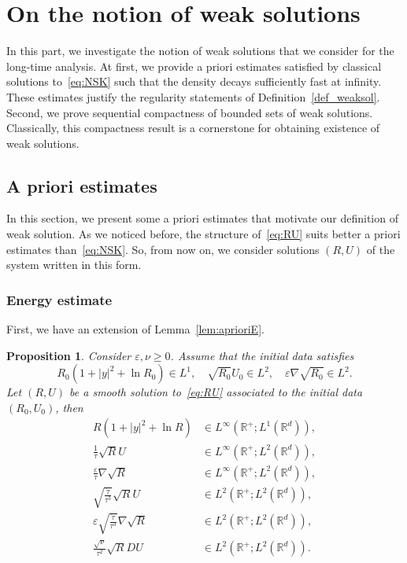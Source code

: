 \documentclass[11pt]{article}
\newtheorem{prop}[theo]{Proposition}
\theoremstyle{definition}
\numberwithin{equation}{section}
\numberwithin{figure}{section}
\numberwithin{table}{section}
\newcommand*\R{\mathbb{R}}
\newcommand*\<{\left\langle}
\renewcommand*\>{\right\rangle}
\renewcommand*\ge{\geqslant}
\newcommand*\eps{\varepsilon}
\begin{document}
\section{On the notion of weak solutions}\label{sec:compactness}

In this part, we investigate the notion of weak solutions that we consider for the long-time analysis. At first, we provide a priori estimates satisfied by classical solutions to~\eqref{eq:NSK} such that the density decays sufficiently fast at infinity. These estimates justify the regularity statements of Definition~\ref{def_weaksol}. Second, we prove sequential compactness of bounded sets of weak solutions. Classically, this compactness result is a cornerstone for obtaining existence of weak solutions.

\subsection{A priori estimates}\label{sec:apriori}

In this section, we present some a priori estimates that motivate our definition of weak solution. As we noticed before, the structure of~\eqref{eq:RU} suits better a priori estimates than~\eqref{eq:NSK}. So, from now on, we consider solutions $(R,U)$ of the system written in this form.

\subsubsection{Energy estimate}

First, we have an extension of Lemma~\ref{lem:aprioriE}.

\begin{prop}\label{prop:apriori-energy}
Consider $\eps, \nu \ge 0$. Assume that the initial data satisfies
\[
R_0(1+|y|^2 + \ln R_0) \in L^1, \quad
\sqrt{R_0} U_0 \in L^2, \quad
\eps \nabla \sqrt{R_0} \in L^2.
\]
Let $(R,U)$ be a smooth solution to~\eqref{eq:RU} associated to the initial data $(R_0,U_0)$, then
\begin{equation}\label{eq:apriori-energy}
\begin{aligned}
R(1+|y|^2 + \ln R) &\in L^\infty(\R^+ ; L^1(\R^d)), \\
\frac{1}{\tau} \sqrt{R} U &\in L^\infty(\R^+ ; L^2 (\R^d)), \\
\frac{\eps}{\tau} \nabla \sqrt{R} &\in L^\infty(\R^+ ; L^2 (\R^d)), \\
\sqrt{\frac{\dot \tau}{\tau^3}} \sqrt R U &\in L^2(\R^+ ; L^2 (\R^d)), \\
\eps \sqrt{\frac{\dot \tau}{\tau^3}} \nabla \sqrt{R} &\in L^2(\R^+ ; L^2 (\R^d)), \\
\frac{\sqrt \nu}{\tau^2} \sqrt{R} DU &\in L^2(\R^+ ; L^2 (\R^d)).
\end{aligned}
\end{equation}
\end{prop}
\end{document}

